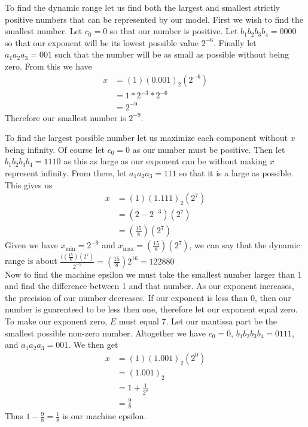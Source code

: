 \documentclass{article}
\begin{document}
		To find the dynamic range let us find both the largest and smallest strictly positive 
		numbers that can be represented by our model.
		First we wish to find the smallest number. Let $c_0 = 0$ so that our number is positive.
		Let $b_1 b_2 b_3 b_4 = 0000$ so that our exponent will be its lowest possible value $2^{-6}$.
		Finally let $a_1a_2a_3 = 001$ such that the number will be as small as possible without being zero.
		From this we have 
		\begin{align*}
			x & =(1)(0.001)_2(2^{-6})\\
			& = 1 * 2^{-3}*2^{-6} \\
			& = 2^{-9}
		\end{align*}
		Therefore our smallest number is $2^{-9}$.

		To find the largest possible number let us maximize each component without $x$ being infinity.
		Of course let $c_0 = 0$ as our number must be positive.
		Then let $b_1 b_2 b_3 b_4 = 1110$ as this as large as our exponent can be without making $x$ represent infinity.
		From there, let $a_1 a_2 a_3 = 111$ so that it is a large as possible.
		This gives us
		\begin{align*}
			x & = (1)(1.111)_2(2^{7}) \\
			& = (2 - 2^{-3})(2^{7}) \\ 
			& = (\frac{15}{8})(2^7)
		\end{align*}
		Given we have $x_{\text{min}} = 2^{-9}$ and $x_{\text{max}} = (\frac{15}{8})(2^7)$, we can say that the dynamic range
		is about $\frac{((\frac{15}{8})(2^7)}{2^{-9}} = (\frac{15}{8})2^{16} = 122880$ \\

		Now to find the machine epsilon we must take the smallest number larger than 1 and find the difference between 1 and that number.
		As our exponent increases, the precision of our number decreases.
		If our exponent is less than 0, then our number is guarenteed to be less then one, therefore let our exponent equal zero.
		To make our exponent zero, $E$ must equal 7.
		Let our mantissa part be the smallest possible non-zero number.
		Altogether we have $c_0 = 0$, $b_1b_2b_3b_4 = 0111$, and $a_1a_2a_3 = 001$.
		We then get 
		\begin{align*}
			x & = (1)(1.001)_2(2^0)\\
			& = (1.001)_2 \\
			& = 1 + \frac{1}{2^3} \\
			& = \frac{9}{8}
		\end{align*}
		Thus $1 - \frac{9}{8} = \frac{1}{8}$ is our machine epsilon.
\end{document}
